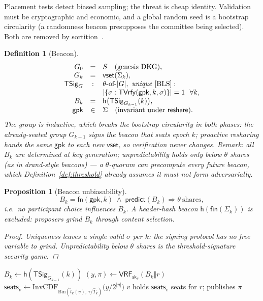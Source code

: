 \documentclass[11pt,letterpaper]{article}
\newtheorem{definition}{Definition}
\newtheorem{proposition}{Proposition}
\begin{document}
Placement tests detect biased sampling; the threat is cheap identity.
Validation must be cryptographic and economic, and a global random seed is
a bootstrap circularity (a randomness beacon presupposes the committee
being selected).  Both are removed by sortition~\cite{Algorand,VRF}.

\begin{definition}[Beacon]\label{def:beacon}
\[
\begin{array}{rcl}
G_0&=&S\quad\text{(genesis DKG)},\\
G_k&=&\mathsf{vset}(\Sigma_k),\\
\mathsf{TSig}_{G}&:&\theta\text{-of-}|G|,\ \text{\emph{unique}~\cite{BLS}}:\\
&&|\{\sigma:\mathsf{TVrfy}(\mathsf{gpk},k,\sigma)\}|=1\ \ \forall k,\\
B_k&=&\mathsf{h}\bigl(\mathsf{TSig}_{G_{k-1}}(k)\bigr),\\
\mathsf{gpk}&\in&\Sigma\quad
  \text{(invariant under $\mathsf{reshare}$)}.
\end{array}
\]
The group is inductive, which breaks the bootstrap circularity in both
phases: the already-seated group $G_{k-1}$ signs the beacon that seats
epoch $k$; proactive resharing hands the same $\mathsf{gpk}$ to each new
$\mathsf{vset}$, so verification never changes.  Remark: all $B_k$ are
determined at key generation; unpredictability holds only below
$\theta$ shares (as in drand-style beacons) --- a $\theta$-quorum can
precompute every future beacon, which
Definition~\ref{def:threshold} already assumes it must not form
adversarially.
\end{definition}

\begin{proposition}[Beacon unbiasability]\label{prop:beacon}
\[
B_k=\mathsf{fn}(\mathsf{gpk},k)
\;\land\;
\mathsf{predict}(B_k)\Rightarrow\theta\ \text{shares},
\]
i.e.\ no participant choice influences $B_k$.  A header-hash beacon
$\mathsf{h}(\mathsf{fin}(\Sigma_k))$ is excluded: proposers grind $B_k$
through content selection.
\begin{proof}
Uniqueness leaves a single valid $\sigma$ per $k$: the signing protocol
has no free variable to grind.  Unpredictability below $\theta$ shares is
the threshold-signature security game.
\end{proof}
\end{proposition}

\begin{algorithm}[H]
\caption{Trust-weighted sortition (node $v$, epoch $k$, role $r$)}
\label{alg:sortition}
\begin{algorithmic}[1]
\State $B_k\gets\mathsf{h}(\mathsf{TSig}_{G_{k-1}}(k))$
\State $(y,\pi)\gets\mathsf{VRF}_{\mathsf{sk}_v}(B_k\Vert r)$
\State $\mathsf{seats}_v\gets
  \mathrm{InvCDF}_{\mathrm{Bin}(\hat t_k(v),\,\tau/\hat T_k)}
  \bigl(y/2^{|y|}\bigr)$
\State $v$ holds $\mathsf{seats}_v$ seats for $r$; publishes $\pi$
\end{algorithmic}
\end{algorithm}
\end{document}
